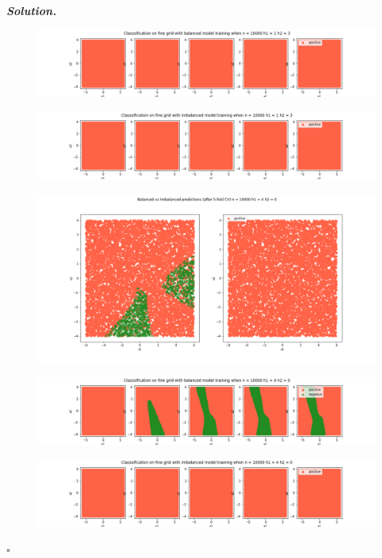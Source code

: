 \documentclass[10pt]{article}
\newenvironment{solution}[1][\it{Solution}]{\textbf{#1. } }{$\square$}
\begin{document}
\begin{solution}
\begin{figure}[H]
\includegraphics[width=16cm, keepaspectratio]{./3/41}
\end{figure}
\begin{figure}[H]
\includegraphics[width=16cm, keepaspectratio]{./3/42}
\end{figure}
\begin{figure}[H]
\includegraphics[width=16cm, keepaspectratio]{./3/43}
\end{figure}
\begin{figure}[H]
\includegraphics[width=16cm, keepaspectratio]{./3/44}
\end{figure}
\begin{figure}[H]
\includegraphics[width=16cm, keepaspectratio]{./3/45}

\end{figure}
\end{solution}
\end{document}
